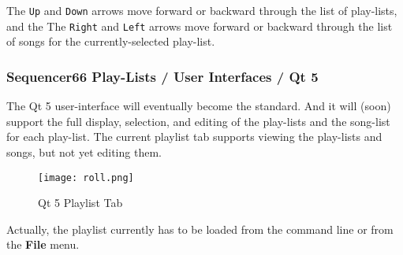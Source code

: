    The \texttt{Up} and \texttt{Down} arrows move forward or backward through
   the list of play-lists, and the
   The \texttt{Right} and \texttt{Left} arrows move forward or backward through
   the list of songs for the currently-selected play-list.

\subsubsection{Sequencer66 Play-Lists / User Interfaces / Qt 5}
\label{subsubsec:playlist_ui_qt}

   The Qt 5 user-interface will eventually become the standard.
   And it will (soon) support the full display, selection, and editing of the
   play-lists and the song-list for each play-list.
   The current playlist tab supports viewing the play-lists and songs, but not
   yet editing them.

\begin{figure}[H]
   \centering 
   \texttt{[image: roll.png]}
   \caption*{Qt 5 Playlist Tab}
\end{figure}

   Actually, the playlist currently has to be loaded from the command line or
   from the \textbf{File} menu.

